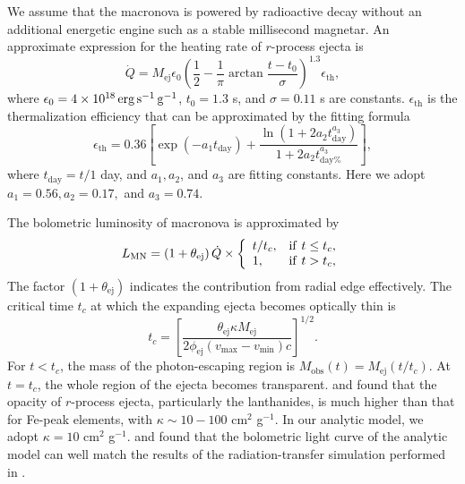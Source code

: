 \documentclass{emulateapj}
\begin{document}
We assume that the macronova is powered by radioactive decay without an additional energetic engine such as a stable millisecond magnetar.
An approximate expression for the heating rate of $r$-process ejecta is \citep{kor12}
\begin{equation}
\dot{Q}=M_{\text{ej}}\epsilon _{0}\left( \frac{1}{2}-\frac{1}{\pi
}\arctan \frac{t-t_{0}}{\sigma }\right) ^{1.3}\epsilon _{\text{th}},
\end{equation}%
where $\epsilon _{0}=4\times 10^{18}\,\rm erg\, s^{-1}\,{\rm g}^{-1}$, $t_{0}=1.3$ s, and $%
\sigma =0.11$ s are constants. $\epsilon _{\text{th}}$ is the
thermalization efficiency that can be approximated by the fitting
formula \citep{bar16}
\begin{equation}
\epsilon _{\text{th}}=0.36\left[ \exp \left( -a_{1}t_{\text{day}}\right) +%
\frac{\ln \left( 1+2a_{2}t_{\text{day}}^{a_{3}}\right) }{1+2a_{2}t_{\text{day%
}}^{a_{3}}}\right] ,
\end{equation}
where $t_{\text{day}}=t/1$ day, and $a_{1},a_{2}$, and $a_{3}$ are
fitting constants. Here we adopt $a_{1}=0.56,a_{2}=0.17,$ and
$a_{3}=0.74.$


The bolometric luminosity of macronova is approximated by
\citep{kaw16,die17}
\begin{equation}
L_{\text{MN}}=\left( 1+\theta _{\text{ej}}\right) \dot{Q}\times
\left\{
\begin{array}{ll}
t/t_{c}, & {\rm if}\,\,t\leq t_{c}, \\
1, & {\rm if}\,\,t>t_{c},%
\end{array}%
\right.
\end{equation}
The factor $\left( 1+\theta _{\text{ej}}\right) $ indicates the
contribution from radial edge effectively. The critical time $t_{c}$
at which the expanding ejecta becomes optically thin \citep{kaw16} is
\begin{equation}
t_{c}=\left[ \frac{\theta _{\text{ej}}\kappa M_{\text{ej}}}{2\phi _{\text{ej}%
}\left( v_{\max }-v_{\min }\right) c}\right] ^{1/2}.
\end{equation}
For $t<t_{c}$, the mass of the photon-escaping region is
$M_{\text{obs}}(t)=M_{\text{ej}}(t/t_c)$. At $t=t_c$, the whole
region of the ejecta becomes transparent. \cite{kas13} and
\cite{bar13} found that the opacity of $r$-process ejecta,
particularly the lanthanides, is much higher than that for Fe-peak
elements, with $\kappa \sim 10-100$ cm$^{2}$ g$^{-1}.$ In our
analytic model, we adopt $\kappa =10$ cm$^{2}$ g$^{-1}.$
\cite{kaw16} and \cite{die17} found that the bolometric light curve
of the analytic model can well match the results of the
radiation-transfer simulation performed in \cite{tana13}.
\end{document}
